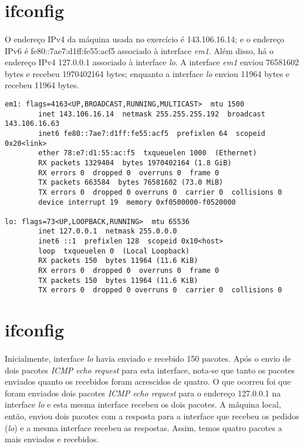 \documentclass[a4paper,10pt,oneside,final,titlepage,onecolumn]{article}
\begin{document}
\section{ifconfig}

\paragraph{}O endereço IPv4 da máquina usada no exercício é \mbox{143.106.16.14}; e o endereço IPv6 é \mbox{fe80::7ae7:d1ff:fe55:acf5} associado à interface \emph{em1}. Além disso, há o endereço IPv4 \mbox{127.0.0.1} associado à interface \emph{lo}. A interface \emph{em1} enviou 76581602 bytes e recebeu 1970402164 bytes; enquanto a interface \emph{lo} enviou 11964 bytes e recebeu 11964 bytes.
\begin{lstlisting}
em1: flags=4163<UP,BROADCAST,RUNNING,MULTICAST>  mtu 1500
        inet 143.106.16.14  netmask 255.255.255.192  broadcast 143.106.16.63
        inet6 fe80::7ae7:d1ff:fe55:acf5  prefixlen 64  scopeid 0x20<link>
        ether 78:e7:d1:55:ac:f5  txqueuelen 1000  (Ethernet)
        RX packets 1329404  bytes 1970402164 (1.8 GiB)
        RX errors 0  dropped 0  overruns 0  frame 0
        TX packets 663584  bytes 76581602 (73.0 MiB)
        TX errors 0  dropped 0 overruns 0  carrier 0  collisions 0
        device interrupt 19  memory 0xf0500000-f0520000  

lo: flags=73<UP,LOOPBACK,RUNNING>  mtu 65536
        inet 127.0.0.1  netmask 255.0.0.0
        inet6 ::1  prefixlen 128  scopeid 0x10<host>
        loop  txqueuelen 0  (Local Loopback)
        RX packets 150  bytes 11964 (11.6 KiB)
        RX errors 0  dropped 0  overruns 0  frame 0
        TX packets 150  bytes 11964 (11.6 KiB)
        TX errors 0  dropped 0 overruns 0  carrier 0  collisions 0
\end{lstlisting}



\section{ifconfig}

\paragraph{}Inicialmente, interface \emph{lo} havia enviado e recebido 150 pacotes. Após o envio de dois pacotes \emph{ICMP echo request} para esta interface, nota-se que tanto os pacotes enviados quanto os recebidos foram acrescidos de quatro. O que ocorreu foi que foram enviados dois pacotes \emph{ICMP echo request} para o endereço \mbox{127.0.0.1} na interface \emph{lo} e esta mesma interface recebeu os dois pacotes. A máquina local, então, enviou dois pacotes com a resposta para a interface que recebeu os pedidos (\emph{lo}) e a mesma interface recebeu as respostas. Assim, temos quatro pacotes a mais enviados e recebidos.
\end{document}
